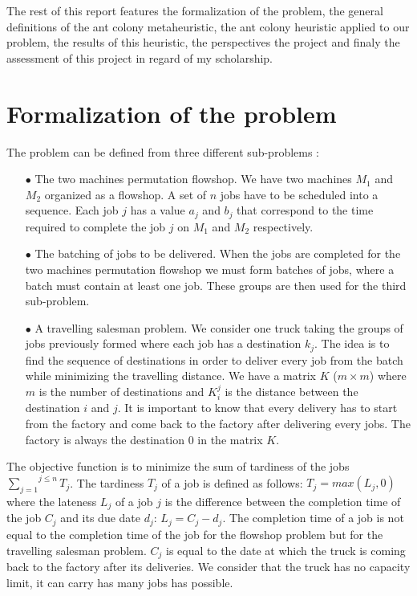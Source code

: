 \documentclass[UTF8, twoside]{EPURapport}
\begin{document}
	The rest of this report features the formalization of the problem, the general definitions of the ant colony metaheuristic, the ant colony heuristic applied to our problem, the results of this heuristic, the perspectives the project and finaly the assessment of this project in regard of my scholarship.

\chapter{Formalization of the problem}

	The problem can be defined from three different sub-problems :
	
\begin{itemize}
\item[$\bullet$] The two machines permutation flowshop. We have two machines $M_1$ and $M_2$ organized as a flowshop. A set of $n$ jobs have to be scheduled into a sequence. Each job $j$ has a value $a_j$ and $b_j$ that correspond to the time required to complete the job $j$ on $M_1$ and $M_2$ respectively.
\item[$\bullet$] The batching of jobs to be delivered. When the jobs are completed for the two machines permutation flowshop we must form batches of jobs, where a batch must contain at least one job. These groups are then used for the third sub-problem.
\item[$\bullet$] A travelling salesman problem. We consider one truck taking the groups of jobs previously formed where each job has a destination $k_j$. The idea is to find the sequence of destinations in order to deliver every job from the batch while minimizing the travelling distance. We have a matrix $K$ ($m \times m$) where $m$ is the number of destinations and $K_i^j$ is the distance between the destination $i$ and $j$. It is important to know that every delivery has to start from the factory and come back to the factory after delivering every jobs. The factory is always the destination 0 in the matrix $K$.
\end{itemize}

	The objective function is to minimize the sum of tardiness of the jobs $\overset{j \leq n}{\underset{j=1}{\sum}} T_j$. The tardiness $T_j$ of a job is defined as follows: $T_j = max(L_j, 0)$ where the lateness $L_j$  of a job $j$ is the difference between the completion time of the job $C_j$ and its due date $d_j$: $L_j = C_j - d_j$. The completion time of a job is not equal to the completion time of the job for the flowshop problem but for the travelling salesman problem. $C_j$ is equal to the date at which the truck is coming back to the factory after its deliveries.
	We consider that the truck has no capacity limit, it can carry has many jobs has possible.
\\
\end{document}
